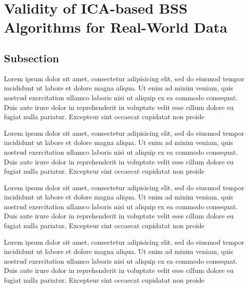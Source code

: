\section{Validity of ICA-based BSS Algorithms for Real-World Data} 

\subsection{Subsection}

Lorem ipsum dolor sit amet, consectetur adipisicing elit, sed do eiusmod tempor incididunt ut labore et dolore magna aliqua. Ut enim ad minim veniam, quis nostrud exercitation ullamco laboris nisi ut aliquip ex ea commodo consequat. Duis aute irure dolor in reprehenderit in voluptate velit esse cillum dolore eu fugiat nulla pariatur. Excepteur sint occaecat cupidatat non proide

Lorem ipsum dolor sit amet, consectetur adipisicing elit, sed do eiusmod tempor incididunt ut labore et dolore magna aliqua. Ut enim ad minim veniam, quis nostrud exercitation ullamco laboris nisi ut aliquip ex ea commodo consequat. Duis aute irure dolor in reprehenderit in voluptate velit esse cillum dolore eu fugiat nulla pariatur. Excepteur sint occaecat cupidatat non proide

Lorem ipsum dolor sit amet, consectetur adipisicing elit, sed do eiusmod tempor incididunt ut labore et dolore magna aliqua. Ut enim ad minim veniam, quis nostrud exercitation ullamco laboris nisi ut aliquip ex ea commodo consequat. Duis aute irure dolor in reprehenderit in voluptate velit esse cillum dolore eu fugiat nulla pariatur. Excepteur sint occaecat cupidatat non proide

Lorem ipsum dolor sit amet, consectetur adipisicing elit, sed do eiusmod tempor incididunt ut labore et dolore magna aliqua. Ut enim ad minim veniam, quis nostrud exercitation ullamco laboris nisi ut aliquip ex ea commodo consequat. Duis aute irure dolor in reprehenderit in voluptate velit esse cillum dolore eu fugiat nulla pariatur. Excepteur sint occaecat cupidatat non proide


